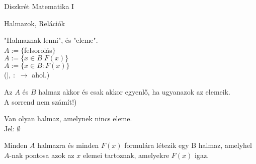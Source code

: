 \newcommand{\mtinyskip}{\vspace{0.2em}}
\newcommand{\msmallskip}{\vspace{0.3em}}
\newcommand{\mmedskip}{\vspace{0.5em}}
\newcommand{\mbigskip}{\vspace{1em}}




\begin{frame}[plain]
\begin{tcolorbox}[center, colback={myyellow}, coltext={black}, colframe={myyellow}]
    {\Huge Diszkrét Matematika I}\\
\end{tcolorbox}
\end{frame}




\begin{frame}[plain]
\begin{tcolorbox}[center, colback={myyellow}, coltext={black}, colframe={myyellow}]
    {\Huge Halmazok, Relációk}
    \mmedskip
\end{tcolorbox}
\end{frame}

\begin{frame}
  \begin{tcolorbox}[title={Def.: A halmazelmélet "Definiálatlan alapfogalmai"}]
    "Halmaznak lenni", és "eleme".\\
    $A := \{$felsorolás$\}$\\
    $A := \{ x \in B | F(x) \}$\\
    $A := \{ x \in B : F(x) \}$\\
    {\footnotesize ($|$, $:$ $\rightarrow$ ahol.)}
  \end{tcolorbox}

  \begin{tcolorbox}[title={Def.:  Meghatározottsági Axióma (Halmazok egyenlősége)}]
    Az $A$ és $B$ halmaz akkor és csak akkor egyenlő, ha ugyanazok az elemeik.\\
    {\footnotesize A sorrend nem számít!)}
  \end{tcolorbox}

  \begin{tcolorbox}[title={Def.: Az üres halaz axiómája}]
    Van olyan halmaz, amelynek nincs eleme.\\
    Jel: $\emptyset$
  \end{tcolorbox}

  \begin{tcolorbox}[title={Def.: Részhalmaz-axióma}]
    Minden $A$ halmazra és minden $F(x)$ formulára létezik egy B halmaz, amelyhel $A$-nak pontosa azok az $x$ elemei tartoznak, amelyekre $F(x)$ igaz.
  \end{tcolorbox}
\end{frame}

